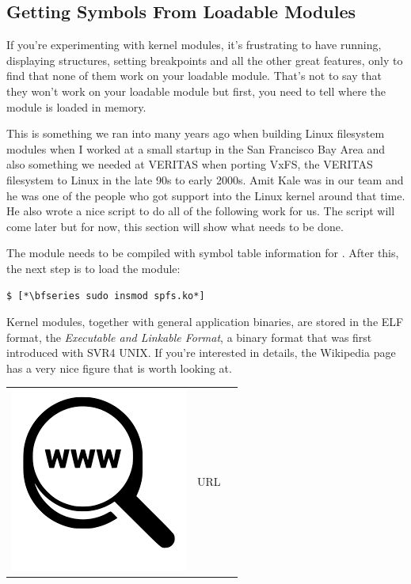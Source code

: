 \subsection{Getting Symbols From Loadable Modules}

If you're experimenting with kernel modules, it's frustrating to have  running, displaying structures, setting breakpoints and all the other great  features, only to find that none of them work on your loadable module. That's not to say that they won't work on your loadable module but first, you need to tell  where the module is loaded in memory.

This is something we ran into many years ago when building Linux filesystem modules when I worked at a small startup in the San Francisco Bay Area and also something we needed at VERITAS when porting VxFS, the VERITAS filesystem to Linux in the late 90s to early 2000s. Amit Kale was in our team and he was one of the people who got  support into the Linux kernel around that time. He also wrote a nice script to do all of the following work for us. The script will come later but for now, this section will show what needs to be done.

The module needs to be compiled with symbol table information for . After this, the next step is to load the module:

\begin{lstlisting}
$ [*\bfseries sudo insmod spfs.ko*]
\end{lstlisting}

\noindent
Kernel modules, together with general application binaries, are stored in the ELF format, the \textit{Executable and Linkable Format}, a binary format that was first introduced with SVR4 UNIX. If you're interested in details, the Wikipedia page has a very nice figure that is worth looking at. 

\begin{table}[h]
\begin{tabular}{lcl}
\parbox[r]{0.5in}{\includegraphics[scale=0.15]{figures/url.png}} & \parbox[l]{0.55in}{URL } & \parbox[l]{3in}{}
\end{tabular}
\end{table}

